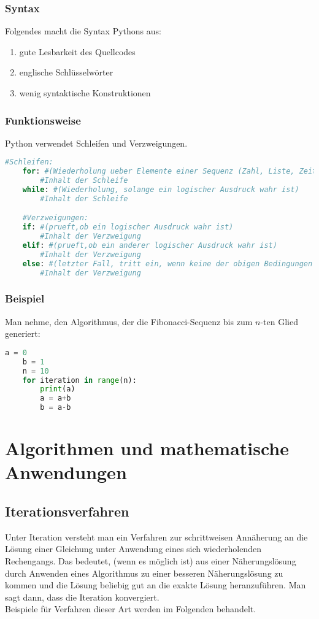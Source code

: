 \subsubsection{Syntax}
Folgendes macht die Syntax Pythons aus:\\
\begin{enumerate}
\item gute Lesbarkeit des Quellcodes
\item englische Schlüsselwörter
\item wenig syntaktische Konstruktionen
\end{enumerate}

\subsubsection{Funktionsweise}
Python verwendet Schleifen und Verzweigungen.\\
\begin{lstlisting}[language=Python]
	#Schleifen:
	for: #(Wiederholung ueber Elemente einer Sequenz (Zahl, Liste, Zeit...))
		#Inhalt der Schleife
	while: #(Wiederholung, solange ein logischer Ausdruck wahr ist)
		#Inhalt der Schleife

	#Verzweigungen:
	if: #(prueft,ob ein logischer Ausdruck wahr ist)
		#Inhalt der Verzweigung
	elif: #(prueft,ob ein anderer logischer Ausdruck wahr ist)
		#Inhalt der Verzweigung
	else: #(letzter Fall, tritt ein, wenn keine der obigen Bedingungen erfuellt wurde)
		#Inhalt der Verzweigung
\end{lstlisting}
\subsubsection{Beispiel}
Man nehme, den Algorithmus, der die Fibonacci-Sequenz bis zum $n$-ten Glied generiert:\\
\begin{lstlisting}[language=Python]
	a = 0
	b = 1
	n = 10
	for iteration in range(n):
		print(a)
		a = a+b
		b = a-b
\end{lstlisting}
\section{Algorithmen und mathematische Anwendungen}
\subsection{Iterationsverfahren}
Unter Iteration versteht man ein Verfahren zur schrittweisen Annäherung an die Lösung einer Gleichung unter Anwendung eines sich wiederholenden Rechengangs. Das bedeutet, (wenn es möglich ist) aus einer Näherungslösung durch Anwenden eines Algorithmus zu einer besseren Näherungslösung zu kommen und die Lösung beliebig gut an die exakte Lösung heranzuführen. Man sagt dann, dass die Iteration konvergiert.\\
Beispiele für Verfahren dieser Art werden im Folgenden behandelt.
